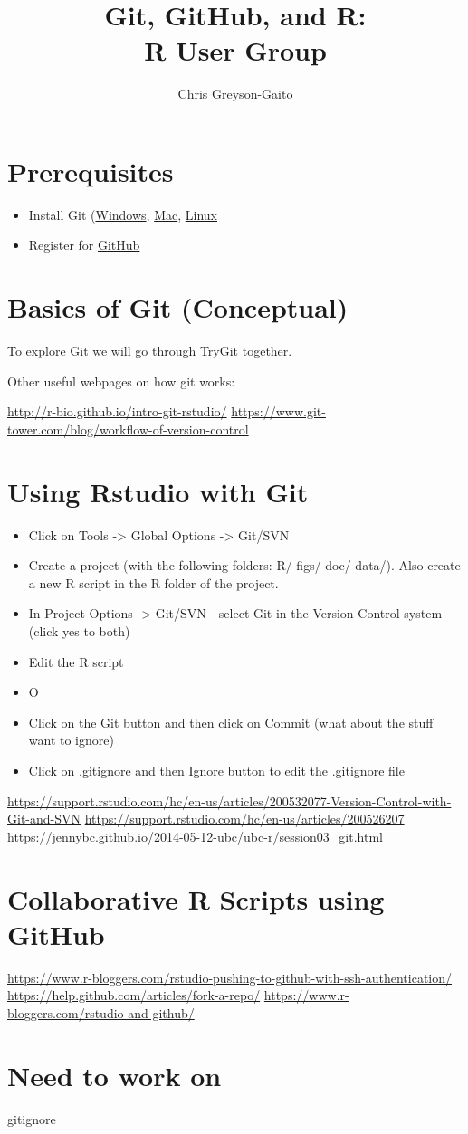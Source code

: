 \documentclass[12pt,letterpaper]{article} %
\begin{document}
\title{Git, GitHub, and R:\\ R User Group}
\author{Chris Greyson-Gaito}
\date{}
\maketitle
\section*{Prerequisites}
\begin{itemize}
\item Install Git (\href{https://git-scm.com/download/win}{Windows}, \href{https://git-scm.com/download/mac}{Mac}, \href{https://git-scm.com/download/linux}{Linux}
\item Register for \href{https://github.com/join?source=header-home}{GitHub}
\end{itemize}
\section*{Basics of Git (Conceptual)}
To explore Git we will go through \href{https://try.github.io/levels/1/challenges/1}{TryGit} together.

Other useful webpages on how git works:

\url{http://r-bio.github.io/intro-git-rstudio/}
\url{https://www.git-tower.com/blog/workflow-of-version-control}


\section*{Using Rstudio with Git}
\begin{itemize}
\item Click on Tools -> Global Options -> Git/SVN
\item Create a project (with the following folders: R/ figs/ doc/ data/). Also create a new R script in the R folder of the project.
\item In Project Options -> Git/SVN - select Git in the Version Control system (click yes to both)
\item Edit the R script
\item O
\item Click on the Git button and then click on Commit (what about the stuff want to ignore)
\item Click on .gitignore and then Ignore button to edit the .gitignore file
\end{itemize}
\url{https://support.rstudio.com/hc/en-us/articles/200532077-Version-Control-with-Git-and-SVN}
\url{https://support.rstudio.com/hc/en-us/articles/200526207}
\url{https://jennybc.github.io/2014-05-12-ubc/ubc-r/session03_git.html}


\section*{Collaborative R Scripts using GitHub}
\url{https://www.r-bloggers.com/rstudio-pushing-to-github-with-ssh-authentication/}
\url{https://help.github.com/articles/fork-a-repo/}
\url{https://www.r-bloggers.com/rstudio-and-github/}
\section*{Need to work on}
gitignore
\end{document}
